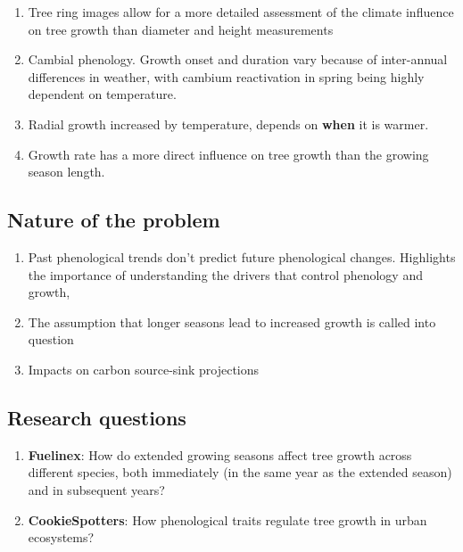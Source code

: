 \documentclass{article}
\begin{document}
\begin{enumerate}
	\item  Tree ring images allow for a more detailed assessment of the climate influence on tree growth than diameter and height measurements 
	\item Cambial phenology. Growth onset and duration vary because of inter-annual differences in weather, with cambium reactivation in spring being highly dependent on temperature. 
	\item Radial growth increased by temperature, depends on \textbf{when} it is warmer. 
	\item Growth rate has a more direct influence on tree growth than the growing season length. 
\end{enumerate}

\subsection{Nature of the problem} 
\begin{enumerate}
	\item Past phenological trends don't predict future phenological changes. Highlights the importance of understanding the drivers that control phenology and growth,
	\item The assumption that longer seasons lead to increased growth is called into question
	\item Impacts on carbon source-sink projections
\end{enumerate}

\subsection {Research questions}
\begin {enumerate}
	\item \textbf{Fuelinex}: How do extended growing seasons affect tree growth across different species, both immediately (in the same year as the extended season) and in subsequent years?
	\item \textbf {CookieSpotters}: How phenological traits regulate tree growth in urban ecosystems?
\end {enumerate}
\end{document}

